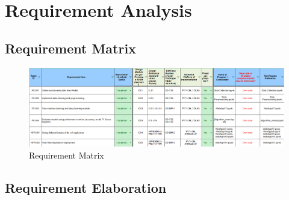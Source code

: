 \pagebreak

\section{Requirement Analysis}

\subsection{Requirement Matrix}
\begin{figure}[h!]  
    \centering
    \includegraphics[width=1.0\textwidth]{Images/Requirement Matrix.png}  
    \caption{Requirement Matrix}
    \label{Requirement Matrix}  %
\end{figure}


\subsection{Requirement Elaboration}


